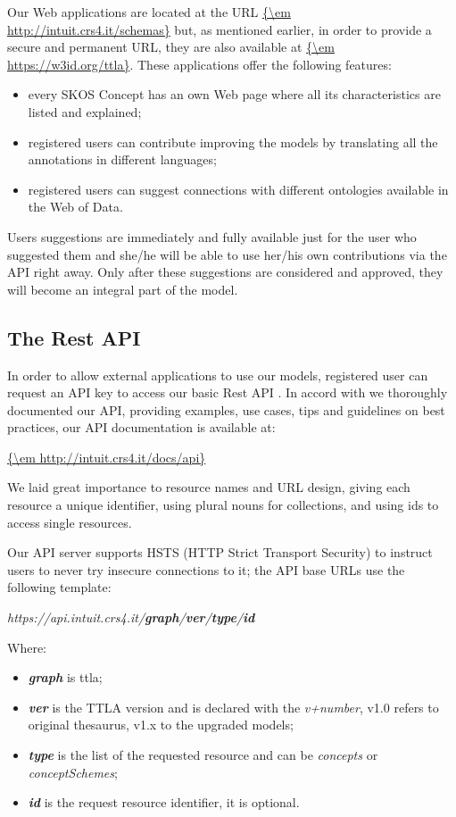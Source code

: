 \documentclass[runningheads,a4paper]{llncs}
\begin{document}
Our Web applications are located at the URL \url{{\em http://intuit.crs4.it/schemas}} but, as mentioned earlier, in order to provide a secure and permanent URL, they are also available at \url{{\em https://w3id.org/ttla}}. These applications offer the following features:
\begin{itemize}
\item every SKOS  Concept has an own Web page where all its characteristics are listed and explained;
\item registered users can contribute improving the models by translating all the annotations in different languages;
\item registered users can suggest connections with different ontologies available in the Web of Data.
\end{itemize}

Users suggestions are immediately and fully available just for the user who suggested them and she/he will be able to use her/his own contributions via the API right away. Only after these suggestions are considered and approved, they will become an integral part of the model.

\subsection{The Rest API}

In order to allow external applications to use our models, registered user can request an API key to access our basic Rest API  \cite{_Ref364511619}. In accord with  \cite{_Ref364511386} we thoroughly documented our API, providing examples, use cases, tips and guidelines on best practices, our API documentation is available at:

\url{{\em http://intuit.crs4.it/docs/api}}

We laid great importance to resource names and URL design, giving each resource a unique identifier, using plural nouns for collections, and using ids to access single resources. 

Our API server supports HSTS (HTTP Strict Transport Security) to instruct users to never try insecure connections to it; the API base URLs use the following template:

{\em https://api.intuit.crs4.it/{}{\bf {\em graph}}{\em }/{}{\bf {\em ver}}{\em }/{}{\bf {\em type}}{\em }/{}{\bf {\em id}}{\em }}

Where: 
\begin{itemize}
\item {\em {}{\bf {\em graph}}{\em }} is ttla; 
\item {\em {}{\bf {\em ver}}{\em }} is the TTLA version and is declared with the {\em v+number}, v1.0 refers to original thesaurus, v1.x to the upgraded models;
\item {\em {}{\bf {\em type}}{\em }} is the list of the requested resource and can be {\em concepts} or {\em conceptSchemes};
\item {\em {}{\bf {\em id}}{\em }} is the request resource identifier, it is optional.
\end{itemize}
\end{document}
